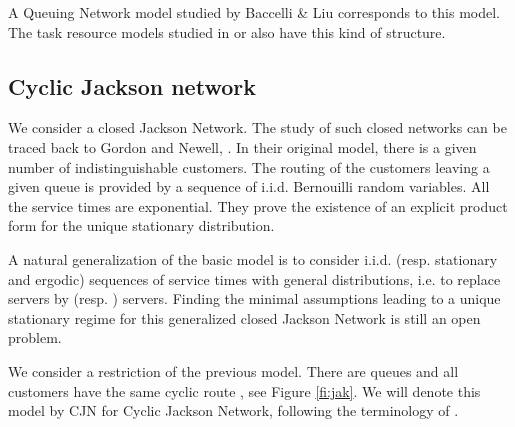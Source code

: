 \documentclass[11pt,titlepage]{article}
\newcommand{\parag}{\medskip\noindent}
\begin{document}
A Queuing Network model studied by Baccelli \& Liu \cite{BaLi92a}
corresponds
to this 
model. The task resource models studied in \cite{BrVi} or \cite{GaMa95} 
also have this kind of structure.


\subsection{Cyclic Jackson network}
\label{sse:cjn}
We consider a closed Jackson Network. The study of such closed networks can be
traced
back to Gordon and Newell, \cite{GoNe}. In their original model,
there is 
a given number of
indistinguishable customers. The routing of  the customers leaving a given
queue 
is provided by a sequence of i.i.d. Bernouilli random variables. All the
service times are exponential.
They prove the existence of an explicit product form for the
unique stationary distribution. 

\parag
A natural generalization of the basic model is to consider
i.i.d. (resp. stationary and ergodic) sequences of service
times with general distributions, i.e. to replace  servers by
 (resp. ) servers. Finding the minimal assumptions
leading to a unique 
stationary regime for this generalized closed Jackson Network is still an open
problem. 

\parag 
We consider a restriction of the previous model. There are  queues and all
customers have the same cyclic route ,  see Figure
\ref{fi:jak}. 
We will
denote this model by CJN for Cyclic Jackson Network, following the terminology
of \cite{KaMa92}.
\end{document}
